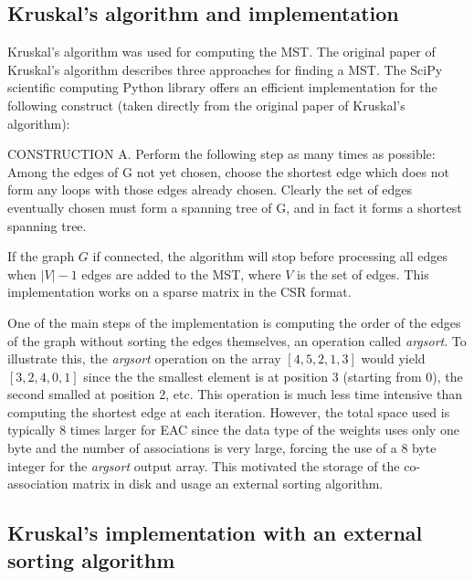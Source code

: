 \subsection{Kruskal's algorithm and implementation}

Kruskal's algorithm was used for computing the MST.
The original paper of Kruskal's \cite{kruskal1956shortest} algorithm describes three approaches for finding a MST.
The SciPy scientific computing Python library \cite{JonesSciPy} offers an efficient implementation for the following construct (taken directly from the original paper of Kruskal's algorithm):
\begin{displayquote}
CONSTRUCTION A. Perform the following step as many times as possible: Among the edges of G not yet chosen, choose the shortest edge which does not form any loops with those edges already chosen. Clearly the set of edges eventually chosen must form a spanning tree of G, and in fact it forms a shortest spanning tree.
\end{displayquote}
If the graph $G$ if connected, the algorithm will stop before processing all edges when $|V| - 1$ edges are added to the MST, where $V$ is the set of edges.
This implementation works on a sparse matrix in the CSR format.

One of the main steps of the implementation is computing the order of the edges of the graph without sorting the edges themselves, an operation called \emph{argsort}.
To illustrate this, the \emph{argsort} operation on the array $ \left [  4 , 5 , 2 , 1, 3 \right ]$ would yield $ \left [  3 , 2 , 4, 0 , 1 \right ]$ since the the smallest element is at position 3 (starting from 0), the second smalled at position 2, etc.
This operation is much less time intensive than computing the shortest edge at each iteration.
However, the total space used is typically 8 times larger for EAC since the data type of the weights uses only one byte and the number of associations is very large, forcing the use of a 8 byte integer for the \emph{argsort} output array.
This motivated the storage of the co-association matrix in disk and usage an external sorting algorithm.

\subsection{Kruskal's implementation with an external sorting algorithm}

